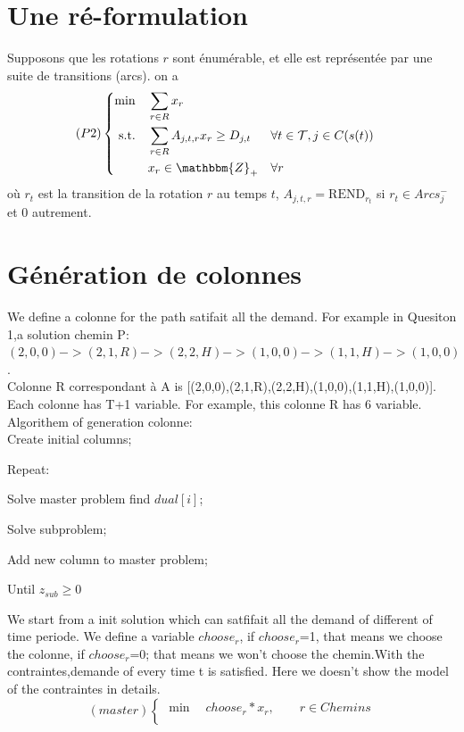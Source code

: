 \documentclass[a4paper]{article}
\begin{document}
\section{Une ré-formulation}
Supposons que les rotations $r$ sont énumérable, et elle est représentée par une suite de transitions (arcs). on a
\begin{equation*}
    (P2) \left\{ 
    \begin{aligned}
    \min\quad        & \sum_{r \in R} x_{r}   \\
    \text{s.t.\quad} & \sum_{r \in R} A_{j,t,r} x_{r} \geq D_{j,t} & & \forall t\in \mathcal{T}, j \in C(s(t))\\
                     & x_r \in \mathbbm{Z}_+            & & \forall r
  \end{aligned}
\right.
\end{equation*}
où $r_t$ est la transition de la rotation $r$ au temps $t$, $A_{j,t,r} = \text{REND}_{r_t}$ si $r_t \in Arcs^{-}_{j}$ et $0$ autrement. 

\section{Génération de colonnes}

We define a colonne for the path satifait all the demand. For example in Quesiton 1,a solution chemin P: $(2,0,0)->(2,1,R)->(2,2,H)->(1,0,0)->(1,1,H)->(1,0,0)$. \\
Colonne R correspondant à A is [(2,0,0),(2,1,R),(2,2,H),(1,0,0),(1,1,H),(1,0,0)]. Each colonne has T+1 variable. For example, this colonne R has 6 variable.
\\

		Algorithem of generation colonne:\\

		Create initial columns;
		
			Repeat:
			
					 Solve master problem find $dual[i]$;
					 
					 Solve subproblem;
					 
					 Add new column to master problem;
					 
	   		 Until $z_{sub} \geq 0$

We start from a init solution which can satfifait all the demand of different of time periode. We define a variable $choose_r$, if $choose_r$=1, that means we choose the colonne, if $choose_r$=0;
that means we won't choose the chemin.With the contraintes,demande of every time t is satisfied. Here we doesn't show the model of the contraintes in details.
\begin{equation*}
    (master) \left\{ 
    \begin{aligned}
    \min\quad   choose_{r}*x_{r} , \qquad r \in Chemins \\
  \end{aligned}
\right.
\end{equation*}
\end{document}
